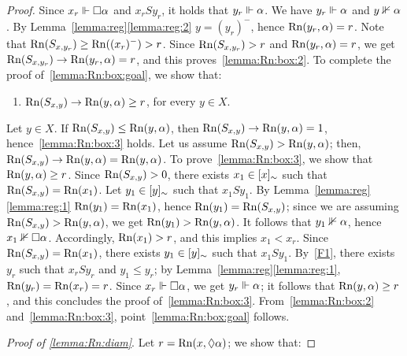 \begin{proof}
\noindent
Since
 $x_r\Vdash \Box \alpha$ and  $x_r S y_r$, it holds that $y_r\Vdash  \alpha$.
 We have    $y_r\Vdash  \alpha$ and   $y\nVdash \alpha$.
By Lemma~\ref{lemma:reg}\ref{lemma:reg:2}   $y=( y_r)^-$, hence
 $\mathrm{Rn}(y_r,\alpha) = r$.
 Note that $\mathrm{Rn}(S_{x,{y_r}})\geq \mathrm{Rn}((x_r)^-)  > r$.
 Since  $\mathrm{Rn}(S_{x,{y_r}}) > r$ and    $\mathrm{Rn}(y_r,\alpha) = r$, we get
  $\mathrm{Rn}(S_{x,y_r}) \to \mathrm{Rn}(y_r,\alpha)= r$, and this proves~\ref{lemma:Rn:box:2}.
To complete the proof of~\ref{lemma:Rn:box:goal}, we show that:
\begin{enumerate}[label=(\alph*), ref=(\alph*),leftmargin=*,start=3]
\item\label{lemma:Rn:box:3}
$\mathrm{Rn}(S_{x,y})\to \mathrm{Rn}(y,\alpha)\geq r$, for every $y\in X$.
\end{enumerate}

\noindent
Let $y\in X$. If $\mathrm{Rn}(S_{x,y})\leq \mathrm{Rn}(y,\alpha)$, then
$\mathrm{Rn}(S_{x,y})\to \mathrm{Rn}(y,\alpha) = 1$, hence~\ref{lemma:Rn:box:3} holds.
Let us assume  $\mathrm{Rn}(S_{x,y}) >  \mathrm{Rn}(y,\alpha)$;
then, $\mathrm{Rn}(S_{x,y})\to \mathrm{Rn}(y,\alpha) =  \mathrm{Rn}(y,\alpha)$.
To prove~\ref{lemma:Rn:box:3}, we show that
$\mathrm{Rn}(y,\alpha)\geq r$.
Since   $\mathrm{Rn}(S_{x,y}) > 0$,
there exists $x_1 \in [x]_\sim$ such that
$\mathrm{Rn}(S_{x,y}) =\mathrm{Rn}(x_1)$. Let $y_1\in [y]_\sim$ such that $x_1 S y_1$.
By Lemma~\ref{lemma:reg}\ref{lemma:reg:1} $\mathrm{Rn}(y_1) = \mathrm{Rn}(x_1)$,
hence  $\mathrm{Rn}(y_1) = \mathrm{Rn}(S_{x,y})$; since we are assuming   $\mathrm{Rn}(S_{x,y}) >  \mathrm{Rn}(y,\alpha)$,
we get $\mathrm{Rn}(y_1) > \mathrm{Rn}(y,\alpha)$.
It follows that  $y_1\nVdash\alpha$, hence $x_1\nVdash \Box\alpha$.
Accordingly,
$\mathrm{Rn}(x_1)> r$, and this implies $x_1 < x_r$. 
Since $\mathrm{Rn}(S_{x,y}) =\mathrm{Rn}(x_1)$,
there exists $y_1\in [y]_\sim$ such that $x_1 S y_1$.
By~\ref{F1},  there exists
 $y_r$ such that $x_r S y_r$ and $y_1\leq y_r$;  by Lemma~\ref{lemma:reg}\ref{lemma:reg:1}, $\mathrm{Rn}(y_r) =\mathrm{Rn}(x_ r)= r$. 
Since $x_r\Vdash \Box \alpha$, we get $y_r\Vdash \alpha$; it follows that
$\mathrm{Rn}(y,\alpha) \geq r$, and this concludes the proof of~\ref{lemma:Rn:box:3}.
From~\ref{lemma:Rn:box:2} and~\ref{lemma:Rn:box:3}, point~\ref{lemma:Rn:box:goal} follows.



\smallskip
\noindent
\emph{Proof of \ref{lemma:Rn:diam}}.
Let $r=\mathrm{Rn}(x,\lozenge \alpha)$;   we show that:


\end{proof}
